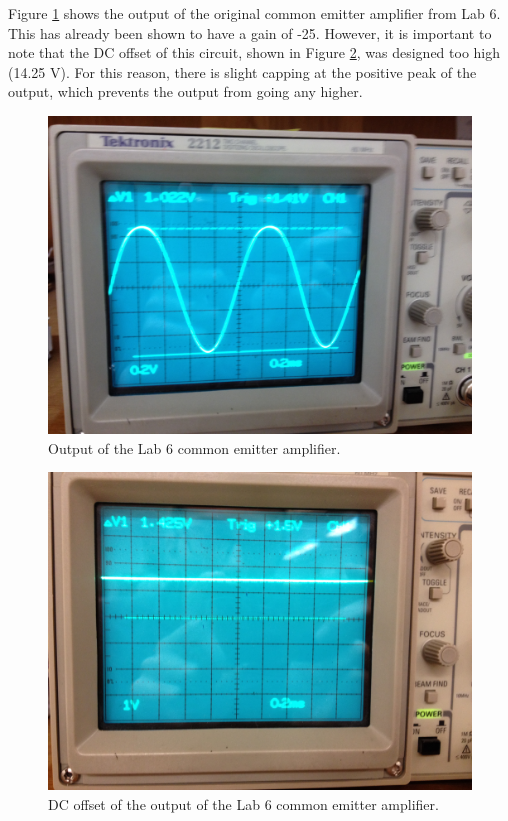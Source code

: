 \documentclass[12pt,letterpaper]{report}
\newlength \figwidth
\begin{document}
Figure \ref{fig:ce_out} shows the output of the original common emitter amplifier from Lab 6. This has already been shown to have a gain of -25. However, it is important to note that the DC offset of this circuit, shown in Figure \ref{fig:ce_dc}, was designed too high (14.25 V). For this reason, there is slight capping at the positive peak of the output, which prevents the output from going any higher. 

\begin{figure}[H]
\centering
\includegraphics[width=\figwidth, keepaspectratio=true]{lab7_images/uncoupled_CE_output.jpg}
\caption{Output of the Lab 6 common emitter amplifier.}
\label{fig:ce_out}
\end{figure}

\begin{figure}[H]
\centering
\includegraphics[width=\figwidth, keepaspectratio=true]{lab7_images/CE_DC_offset.jpg}
\caption{DC offset of the output of the Lab 6 common emitter amplifier.}
\label{fig:ce_dc}
\end{figure}
\end{document}
